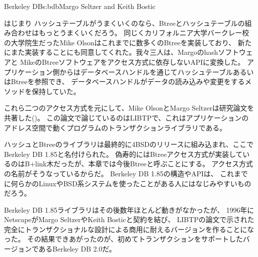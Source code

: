 \begin{aosachapter}{Berkeley DB}{s:bdb}{Margo Seltzer and Keith Bostic}
\begin{aosasect1}{はじまり}
ハッシュテーブルがうまくいくのなら、Btreeとハッシュテーブルの組み合わせはもっとうまくいくだろう。
同じくカリフォルニア大学バークレー校の大学院生だったMike Olsonはこれまでに数多くのBtreeを実装しており、
新たにまた実装することにも同意してくれた。我々三人は、Margoのhashソフトウェアと
MikeのBtreeソフトウェアをアクセス方式に依存しないAPIに変換した。
アプリケーション側からはデータベースハンドルを通じてハッシュテーブルあるいはBtreeを参照でき、
データベースハンドルがデータの読み込みや変更をするメソッドを保持していた。

これら二つのアクセス方式を元にして、Mike OlsonとMargo Seltzerは研究論文を共著した(\cite{bib:seltzer:libtp})。
この論文で論じているのはLIBTPで、これはアプリケーションのアドレス空間で動くプログラムのトランザクションライブラリである。

ハッシュとBtreeのライブラリは最終的に4BSDのリリースに組み込まれ、ここでBerkeley DB 1.85と名付けられた。
偽寿的にはBtreeアクセス方式が実装しているのはB+link木だったが、本章では今後Btreeと呼ぶことにする。
アクセス方式の名前がそうなっているからだ。
Berkeley DB 1.85の構造やAPIは、
これまでに何らかのLinuxやBSD系システムを使ったことがある人にはなじみやすいものだろう。

Berkeley DB 1.85ライブラリはその後数年ほとんど動きがなかったが、
1996年にNetscapeがMargo SeltzerやKeith Bosticと契約を結び、
LIBTPの論文で示された完全にトランザクショナルな設計による商用に耐えるバージョンを作ることになった。
その結果できあがったのが、初めてトランザクションをサポートしたバージョンであるBerkeley DB 2.0だ。


\end{aosasect1}
\end{aosachapter}
